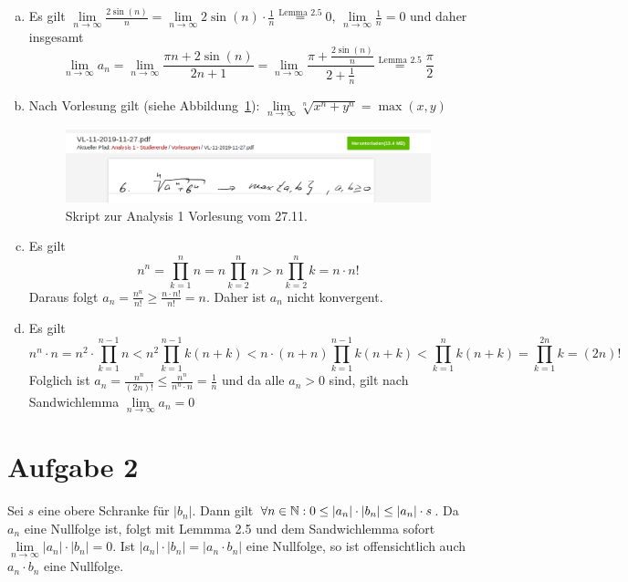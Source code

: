 \documentclass{article}
\newcommand{\mylim}{\lim\limits_{n\to \infty}}
\begin{document}
\begin{enumerate}[(a)]
		\item Es gilt $\mylim \frac{2\sin(n)}{n} = \mylim 2\sin(n) \cdot \frac{1}{n} \overset{\text{Lemma 2.5}}{=} 0$, $\mylim \frac{1}{n} = 0$ und daher insgesamt
		$$\mylim a_n = \mylim \frac{\pi n + 2 \sin(n)}{2n + 1} = \mylim \frac{\pi + \frac{2\sin(n)}{n}}{2 + \frac{1}{n}} \overset{\text{Lemma 2.5}}{=} \frac{\pi}{2}$$
		\item Nach Vorlesung gilt (siehe Abbildung~\ref{anaskript1}): $\mylim \sqrt[n]{x^n + y^n} = \max(x,y)$
		\begin{figure}
			\includegraphics[width = \textwidth]{anaskript.png}
			\caption{Skript zur Analysis 1 Vorlesung vom 27.11.}
			\label{anaskript1}
		\end{figure}
		\item Es gilt
		$$n^n = \prod_{k=1}^{n}n = n\prod_{k=2}^{n}n > n\prod_{k=2}^{n}k = n \cdot n!$$
		Daraus folgt $a_n = \frac{n^n}{n!} \geq \frac{n\cdot n!}{n!} = n$. Daher ist $a_n$ nicht konvergent.
		\item Es gilt
		$$n^n\cdot n = n^2\cdot \prod_{k=1}^{n-1}n <  n^2\prod_{k=1}^{n-1}k(n+k) < n\cdot (n+n) \prod_{k=1}^{n-1}k(n+k) < \prod_{k=1}^{n}k(n+k)= \prod_{k=1}^{2n}k = (2n)!$$
		Folglich ist $a_n = \frac{n^n}{(2n)!} \leq \frac{n^n}{n^n\cdot n} = \frac{1}{n}$ und da alle $a_n> 0$ sind, gilt nach Sandwichlemma $\mylim a_n = 0$
	\end{enumerate}
	\section*{Aufgabe 2}
	Sei $s$ eine obere Schranke für $|b_n|$. Dann gilt $\forall n\in \mathbb{N}: 0  \leq |a_n|\cdot |b_n| \leq |a_n|\cdot s$. Da $a_n$ eine Nullfolge ist, folgt mit Lemmma 2.5 und dem Sandwichlemma sofort $\mylim |a_n|\cdot |b_n| = 0$. Ist $|a_n| \cdot |b_n| = |a_n\cdot b_n|$ eine Nullfolge, so ist offensichtlich auch $a_n\cdot b_n$ eine Nullfolge.
\end{document}
